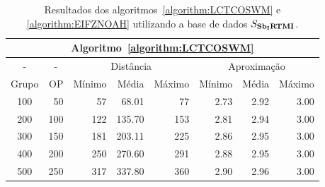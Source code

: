 \begin{table}[!htb]
  \caption{Resultados dos algoritmos~\ref{algorithm:LCTCOSWM} e \ref{algorithm:EIFZNOAH} utilizando a base de dados $S_{\textbf{Sb\textsubscript{I}RTMI}}{}$.}
  \label{table:FTGAXJEH}
  \centering
  \begin{tabular}{|c|r|r|r|r|r|r|r|}
    \hline
    \multicolumn{8}{|c|}{Algoritmo~\ref{algorithm:LCTCOSWM}}                                                                    \\ \hline
      -      & \multicolumn{1}{c|}{-} & \multicolumn{3}{c|}{Distância}             & \multicolumn{3}{c|}{Aproximação}           \\ \hline
    Grupo    & OP                     & Mínimo       & Média        & Máximo       & Mínimo       & Média        & Máximo       \\ \hline  
    100      & 50                     & 57           & 68.01        & 77           & 2.73         & 2.92         & 3.00         \\ \hline
    200      & 100                    & 122          & 135.70       & 153          & 2.81         & 2.94         & 3.00         \\ \hline
    300      & 150                    & 181          & 203.11       & 225          & 2.86         & 2.95         & 3.00         \\ \hline
    400      & 200                    & 250          & 270.60       & 291          & 2.88         & 2.95         & 3.00         \\ \hline
    500      & 250                    & 317          & 337.80       & 360          & 2.90         & 2.96         & 3.00         \\ \hline    
  \end{tabular}

  \vspace{5mm}


\end{table}
